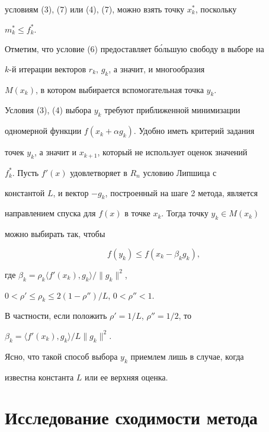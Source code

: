 условиям (3), (7) или (4), (7), можно взять точку $x^*_k$, поскольку


$m^*_k\leq f^*_k$.





Отметим, что условие (6) предоставляет б\'ольшую свободу в выборе на


$k$-й итерации векторов $r_k$, $ g_k$, а значит, и многообразия


$M(x_k)$, в котором выбирается вспомогательная точка $y_k$. 





Условия (3), (4) выбора $y_k$ требуют приближенной минимизации 


одномерной функции $f(x_k+\alpha g_k)$. Удобно иметь критерий задания


точек $y_k$, а значит и $x_{k+1}$, который не использует оценок значений


$f^*_k$. Пусть $f'(x)$ удовлетворяет в $R_n$ условию Липшица с


константой $L$, и вектор $-g_k$, построенный на шаге 2 метода, является


направлением спуска для $f(x)$ в точке $x_k$. Тогда точку $y_k\in M(x_k)$


можно выбирать так, чтобы


\begin{equation}


f(y_k)\leq f(x_k-\beta_k g_k),


\end{equation}


где $\beta_k=\rho_k\langle f'(x_k),g_k\rangle/\|g_k\|^2$,


$0<\rho'\leq \rho_k\leq 2(1-\rho'')/L$, $0<\rho''<1$.


В частности, если положить $\rho'=1/L$, $\rho''=1/2$, то


$\beta_k=\langle f'(x_k),g_k\rangle /L\|g_k\|^2$.


Ясно, что такой способ выбора $y_k$ приемлем лишь в случае, когда


известна константа $L$ или ее верхняя оценка.





\section{Исследование сходимости метода}





